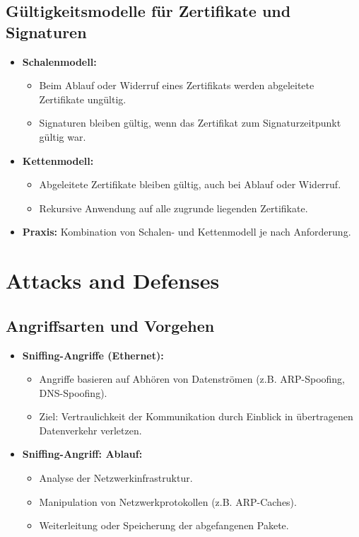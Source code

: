 \documentclass{article}
\begin{document}
\subsection{Gültigkeitsmodelle für Zertifikate und Signaturen}
\begin{itemize}
    \item \textbf{Schalenmodell:}
    \begin{itemize}
        \item Beim Ablauf oder Widerruf eines Zertifikats werden abgeleitete Zertifikate ungültig.
        \item Signaturen bleiben gültig, wenn das Zertifikat zum Signaturzeitpunkt gültig war.
    \end{itemize}
    \item \textbf{Kettenmodell:}
    \begin{itemize}
        \item Abgeleitete Zertifikate bleiben gültig, auch bei Ablauf oder Widerruf.
        \item Rekursive Anwendung auf alle zugrunde liegenden Zertifikate.
    \end{itemize}
    \item \textbf{Praxis:} Kombination von Schalen- und Kettenmodell je nach Anforderung.
\end{itemize}


\section{Attacks and Defenses}

\subsection{Angriffsarten und Vorgehen}
\begin{itemize}
    \item \textbf{Sniffing-Angriffe (Ethernet):}
    \begin{itemize}
        \item Angriffe basieren auf Abhören von Datenströmen (z.B. ARP-Spoofing, DNS-Spoofing).
        \item Ziel: Vertraulichkeit der Kommunikation durch Einblick in übertragenen Datenverkehr verletzen.
    \end{itemize}
    \item \textbf{Sniffing-Angriff: Ablauf:}
    \begin{itemize}
        \item Analyse der Netzwerkinfrastruktur.
        \item Manipulation von Netzwerkprotokollen (z.B. ARP-Caches).
        \item Weiterleitung oder Speicherung der abgefangenen Pakete.
    \end{itemize}
\end{itemize}
\end{document}
